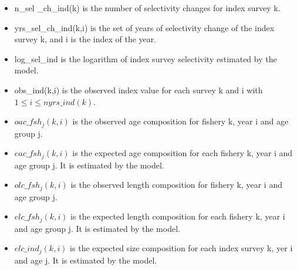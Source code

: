 \documentclass{article}
\begin{document}
\begin{itemize}
    
    \item n\_sel \_ch\_ind(k) is the   number of selectivity changes for index survey k.
    \item yrs\_sel\_ch\_ind(k,i) is the set of years of selectivity change of the index survey k, and i is the index of the year.
    \item log\_sel\_ind is the logarithm of index survey selectivity estimated by the model.
    \item obs\_ind(k,i) is the observed index value for each survey k and i with $1\leq i \leq nyrs\_ind(k)$.
   
    \item $oac\_fsh_j(k,i)$ is the observed age composition for fishery k, year i and age group j.
    \item $eac\_fsh_j(k,i)$ is the expected age composition for each fishery k, year i and age group j. It is estimated by the model.
    
    \item $olc\_fsh_j(k,i)$ is the observed length composition for fishery k, year i and age group j.
    \item $elc\_fsh_j(k,i)$ is the expected length composition for each fishery k, year i and age group j. It is estimated by the model.
    
    \item $elc\_ind_j(k,i)$ is the expected size composition for each index survey k, yer i and age j. It is estimated by the model.
    

\end{itemize}
\end{document}

